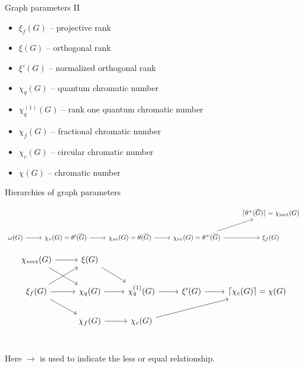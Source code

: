 \documentclass{beamer}
\renewcommand{\>}{\rangle}
\newcommand{\<}{\langle}
\begin{document}
%

\begin{frame}{Graph parameters II}
\begin{itemize}
\item $\xi_f(G)$ -- projective rank
\item $\xi(G)$ -- orthogonal rank
\item $\xi'(G)$ -- normalized orthogonal rank
\item  $\chi_q(G)$ -- quantum chromatic number
\item $\chi_q^{(1)}(G)$ -- rank one quantum chromatic number
\item $\chi_f(G)$ -- fractional chromatic number
\item $\chi_c(G)$ -- circular chromatic number
\item $\chi(G)$ -- chromatic number
\end{itemize}
\end{frame}

%

\begin{frame}[fragile]{Hierarchies of graph parameters}

{\tiny
\[
\begin{tikzcd}
                        &                        &                                                            &                                                     & \lceil \theta^+(\overline{G}) \rceil = \chi_{\mathrm{vect}}(G)  \\
\omega(G) \ar[r] & \chi_v(G)=\theta'(\overline{G}) \ar[r] &\chi_{sv}(G) = \theta(\overline{G}) \ar[r]  & \chi_{rv}(G) = \theta^+(\overline{G}) \ar[r] \ar[ru] & \xi_f(G) 
\end{tikzcd}
\]

\medskip
\[
\begin{tikzcd}
\chi_{\mathrm{vect}}(G)   \ar[r] \ar[rd]         &  \xi(G)       \ar[to=2-3] \\ 
\xi_f(G ) \ar[to=2-2] \ar[to=1-2] \ar[to=3-2] &  \chi_q(G)  \ar[to=2-3]  & \chi_q^{(1)}(G) \ar[to=2-4] & \xi'(G) \ar[to=2-5] & \lceil \chi_c(G) \rceil = \chi(G) \\
                                                               &  \chi_f(G)     \ar[to=3-3] & \chi_c(G) \ar[to=2-5] \\
\end{tikzcd}
\]
}
Here $\longrightarrow$ is used to indicate the less or equal relationship.
\end{frame}

%
\end{document}
